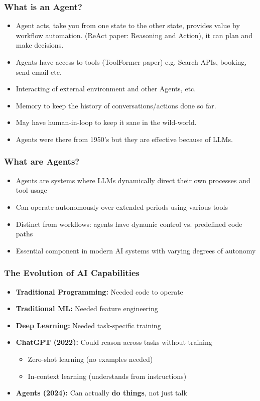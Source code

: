 \begin{frame}[fragile]\frametitle{What is an Agent?}
    \begin{itemize}
        \item Agent acts, take you from one state to the other state, provides value by workflow automation. (ReAct paper: Reasoning and Action), it can plan and make decisions.
		\item Agents have access to tools (ToolFormer paper) e.g. Search APIs, booking, send email etc.
		\item Interacting of external environment and other Agents, etc.
		\item Memory to keep the history of conversations/actions done so far.
		\item May have human-in-loop to keep it sane in the wild-world.
		\item Agents were there from 1950's but they are effective because of LLMs.
    \end{itemize}
\end{frame}

\begin{frame}[fragile]\frametitle{What are Agents?}
    \begin{itemize}
        \item Agents are systems where LLMs dynamically direct their own processes and tool usage
        \item Can operate autonomously over extended periods using various tools
        \item Distinct from workflows: agents have dynamic control vs. predefined code paths
        \item Essential component in modern AI systems with varying degrees of autonomy
    \end{itemize}
\end{frame}

\begin{frame}[fragile]\frametitle{The Evolution of AI Capabilities}
\begin{itemize}
    \item \textbf{Traditional Programming:} Needed code to operate
    \item \textbf{Traditional ML:} Needed feature engineering
    \item \textbf{Deep Learning:} Needed task-specific training
    \item \textbf{ChatGPT (2022):} Could reason across tasks without training
    \begin{itemize}
        \item Zero-shot learning (no examples needed)
        \item In-context learning (understands from instructions)
    \end{itemize}
    \item \textbf{Agents (2024):} Can actually \textbf{do things}, not just talk
\end{itemize}
\end{frame}

